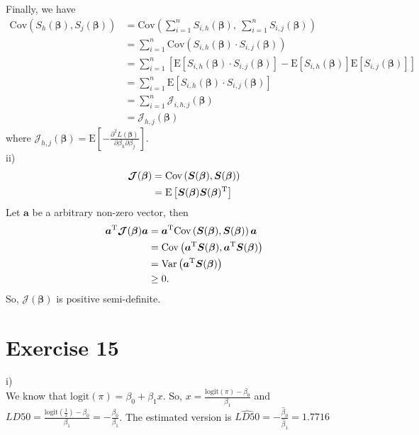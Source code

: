 \documentclass[a4paper]{article}
\newcommand{\E}{\mathrm{E}}
\newcommand{\Var}{\mathrm{Var}}
\newcommand{\Cov}{\mathrm{Cov}}
\begin{document}
Finally, we have
\begin{align*}
\Cov\left(S_{h}(\bm{\beta}), S_{j}(\bm{\beta})\right) &= \Cov\left(\sum_{i=1}^{n}S_{i,h}(\bm{\beta}),~ \sum_{i=1}^{n}S_{i,j}(\bm{\beta})\right)\\
&= \sum_{i=1}^{n} \Cov\left(S_{i,h}(\bm{\beta}) \cdot S_{i,j}(\bm{\beta})\right) \tag{$\because$ independence}\\
&= \sum_{i=1}^{n} \left[\E\left[S_{i,h}(\bm{\beta}) \cdot S_{i,j}(\bm{\beta})\right] - \E\left[S_{i,h}(\bm{\beta})\right] \E\left[S_{i,j}(\bm{\beta})\right]\right]\\
&= \sum_{i=1}^{n}\E\left[S_{i,h}(\bm{\beta}) \cdot S_{i,j}(\bm{\beta})\right] \tag{by lemma 1}\\
&= \sum_{i=1}^{n} \mathcal{J}_{i,h,j}(\bm{\beta}) \tag{by lemma 2}\\
&= \mathcal{J}_{h,j}(\bm{\beta})
\end{align*}
where $\mathcal{J}_{h,j}(\bm{\beta}) = \E\left[-\frac{\partial^{2} L(\bm{\beta})}{\partial \beta_{h} \partial \beta_{j}} \right]$.\\

ii)
\begin{align*}
\bm{\mathcal{J}}(\bm{\beta}) &= \Cov\left(\bm{S}(\bm{\beta}),\bm{S}(\bm{\beta})\right)\\
&= \E\left[\bm{S}(\bm{\beta}) \bm{S}(\bm{\beta})^{\rm T}\right]
\end{align*}
Let $\bm{a}$ be a arbitrary non-zero vector, then
\begin{align*}
\bm{a}^{\rm T}\bm{\mathcal{J}}(\bm{\beta})\bm{a} &= \bm{a}^{\rm T}\Cov\left(\bm{S}(\bm{\beta}),\bm{S}(\bm{\beta})\right)\bm{a}\\
&= \Cov\left(\bm{a}^{\rm T}\bm{S}(\bm{\beta}),\bm{a}^{\rm T}\bm{S}(\bm{\beta})\right)\\
&= \Var\left(\bm{a}^{\rm T}\bm{S}(\bm{\beta})\right)\\
&\geq 0.
\end{align*}
So, $\bm{\mathcal{J}}(\bm{\beta})$ is positive semi-definite.



\vspace{\baselineskip}
\section{Exercise 15}
i)\\
We know that $\mathrm{logit}(\pi) = \beta_{0} + \beta_{1}x$. So, $x = \frac{\mathrm{logit}(\pi) - \beta_{0}}{\beta_{1}}$ and $LD50 = \frac{\mathrm{logit}\left(\frac{1}{2}\right) - \beta_{0}}{\beta_{1}} = -\frac{\beta_{0}}{\beta_{1}}$. The estimated version is $\widehat{LD50} = -\frac{\widehat{\beta}_{0}}{\widehat{\beta}_{1}} = 1.7716$
\end{document}
